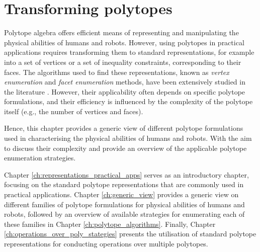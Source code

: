 

\chapter{Transforming polytopes}

Polytope algebra offers efficient means of representing and manipulating the physical abilities of humans and robots. However, using polytopes in practical applications requires transforming them to standard representations, for example into a set of vertices or a set of inequality constraints, corresponding to their faces. The algorithms used to find these representations, known as \textit{vertex enumeration} and \textit{facet enumeration} methods, have been extensively studied in the literature \cite{fukuda2004frequently}. However, their applicability often depends on specific polytope formulations, and their efficiency is influenced by the complexity of the polytope itself (e.g., the number of vertices and faces).

Hence, this chapter provides a generic view of different polytope formulations used in characterising the physical abilities of humans and robots. With the aim to discuss their complexity and provide an overview of the applicable polytope enumeration strategies.

Chapter \ref{ch:representations_practical_apps} serves as an introductory chapter, focusing on the standard polytope representations that are commonly used in practical applications. Chapter \ref{ch:generic_view} provides a generic view on different families of polytope formulations for physical abilities of humans and robots, followed by an overview of available strategies for enumerating each of these families in Chapter \ref{ch:polytope_algorithms}. Finally, Chapter \ref{ch:operations_over_poly_stategies} presents the utilisation of standard polytope representations for conducting operations over multiple polytopes.


